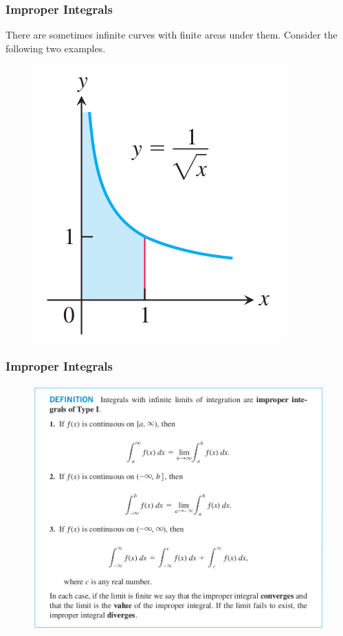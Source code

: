 \documentclass[xcolor=dvipsnames]{beamer}
\begin{document}
\begin{frame}
  \frametitle{Improper Integrals}
  There are sometimes infinite curves with finite areas under them.
  Consider the following two examples. 
  \begin{figure}[h]
    \includegraphics[scale=0.5]{./diagrams/improper2.png}
  \end{figure}
\end{frame}

\begin{frame}
  \frametitle{Improper Integrals}
  \begin{figure}[h]
    \includegraphics[scale=0.3]{./diagrams/improper3.png}
  \end{figure}
\end{frame}
\end{document}
